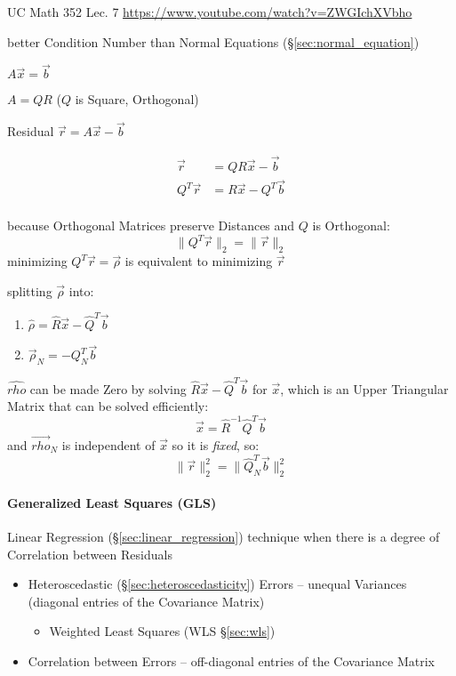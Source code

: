 UC Math 352 Lec. 7 \url{https://www.youtube.com/watch?v=ZWGIchXVbho}

better Condition Number than Normal Equations (\S\ref{sec:normal_equation})

$A\vec{x} = \vec{b}$

$A = QR$ ($Q$ is Square, Orthogonal)

Residual $\vec{r} = A\vec{x} - \vec{b}$

\begin{align*}
     \vec{r} & = QR\vec{x} - \vec{b} \\
  Q^T\vec{r} & = R\vec{x} - Q^T\vec{b} \\
\end{align*}

because Orthogonal Matrices preserve Distances and $Q$ is Orthogonal:
\[
  \|Q^T\vec{r}\|_2 = \|\vec{r}\|_2
\]
minimizing $Q^T\vec{r} = \vec{\rho}$ is equivalent to minimizing $\vec{r}$

splitting $\vec{\rho}$ into:
\begin{enumerate}
  \item $\hat{\rho}   = \hat{R}\vec{x} - \hat{Q}^T\vec{b}$
  \item $\vec{\rho}_N = -Q_N^T\vec{b}$
\end{enumerate}
$\hat{rho}$ can be made Zero by solving $\hat{R}\vec{x} - \hat{Q}^T\vec{b}$ for
$\vec{x}$, which is an Upper Triangular Matrix that can be solved efficiently:
\[
  \hat{\vec{x}} = \hat{R}^{-1}\hat{Q}^T\vec{b}
\]
and $\vec{rho}_N$ is independent of $\vec{x}$ so it is \emph{fixed}, so:
\[
  \|\vec{r}\|^2_2 = \|\hat{Q}_N^T\vec{b}\|_2^2
\]



\paragraph{Generalized Least Squares (GLS)}\label{sec:gls}\hfill

Linear Regression (\S\ref{sec:linear_regression}) technique when there is a
degree of Correlation between Residuals

\begin{itemize}
  \item Heteroscedastic (\S\ref{sec:heteroscedasticity}) Errors -- unequal
    Variances (diagonal entries of the Covariance Matrix)
    \begin{itemize}
      \item Weighted Least Squares (WLS \S\ref{sec:wls})
    \end{itemize}
  \item Correlation between Errors -- off-diagonal entries of the Covariance
    Matrix
\end{itemize}

